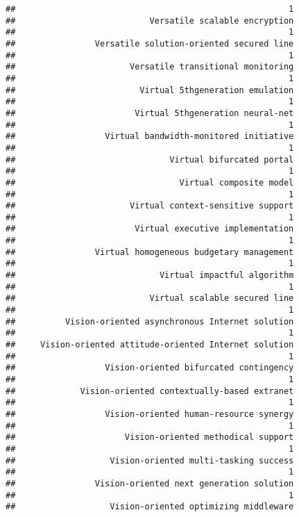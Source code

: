 \documentclass[
]{article}
\begin{document}
\begin{verbatim}
##                                                       1 
##                           Versatile scalable encryption 
##                                                       1 
##                Versatile solution-oriented secured line 
##                                                       1 
##                       Versatile transitional monitoring 
##                                                       1 
##                         Virtual 5thgeneration emulation 
##                                                       1 
##                        Virtual 5thgeneration neural-net 
##                                                       1 
##                  Virtual bandwidth-monitored initiative 
##                                                       1 
##                               Virtual bifurcated portal 
##                                                       1 
##                                 Virtual composite model 
##                                                       1 
##                       Virtual context-sensitive support 
##                                                       1 
##                        Virtual executive implementation 
##                                                       1 
##                Virtual homogeneous budgetary management 
##                                                       1 
##                             Virtual impactful algorithm 
##                                                       1 
##                           Virtual scalable secured line 
##                                                       1 
##          Vision-oriented asynchronous Internet solution 
##                                                       1 
##     Vision-oriented attitude-oriented Internet solution 
##                                                       1 
##                  Vision-oriented bifurcated contingency 
##                                                       1 
##             Vision-oriented contextually-based extranet 
##                                                       1 
##                  Vision-oriented human-resource synergy 
##                                                       1 
##                      Vision-oriented methodical support 
##                                                       1 
##                   Vision-oriented multi-tasking success 
##                                                       1 
##                Vision-oriented next generation solution 
##                                                       1 
##                   Vision-oriented optimizing middleware 

\end{verbatim}
\end{document}
